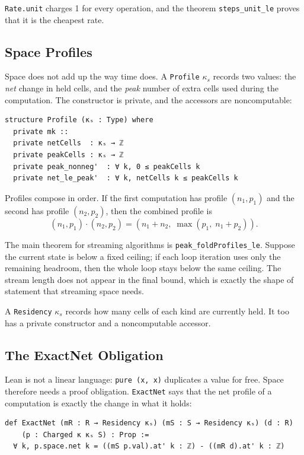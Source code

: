 \documentclass[acmsmall,nonacm]{acmart}
\begin{document}
\lstinline{Rate.unit} charges 1 for every operation, and the theorem \lstinline{steps_unit_le} proves that it is the cheapest rate.

\subsection{Space Profiles}\label{sec:profiles}

Space does not add up the way time does.
A \lstinline{Profile} $\kappa_s$ records two values: the \emph{net} change in held cells, and the \emph{peak} number of extra cells used during the computation.
The constructor is private, and the accessors are noncomputable:

\begin{lstlisting}
structure Profile (κₛ : Type) where
  private mk ::
  private netCells  : κₛ → ℤ
  private peakCells : κₛ → ℤ
  private peak_nonneg'  : ∀ k, 0 ≤ peakCells k
  private net_le_peak'  : ∀ k, netCells k ≤ peakCells k
\end{lstlisting}

Profiles compose in order.
If the first computation has profile $(n_1,p_1)$ and the second has profile $(n_2,p_2)$, then the combined profile is
\[
(n_1, p_1) \cdot (n_2, p_2) = (n_1 + n_2,\; \max(p_1,\; n_1 + p_2)).
\]

The main theorem for streaming algorithms is \lstinline{peak_foldProfiles_le}.
Suppose the current state is below a fixed ceiling; if each loop iteration uses only the remaining headroom, then the whole loop stays below the same ceiling.
The stream length does not appear in the final bound, which is exactly the shape of statement that streaming space needs.

A \lstinline{Residency} $\kappa_s$ records how many cells of each kind are currently held.
It too has a private constructor and a noncomputable accessor.

\subsection{The ExactNet Obligation}\label{sec:exactnet}

Lean is not a linear language: \lstinline{pure (x, x)} duplicates a value for free.
Space therefore needs a proof obligation.
\lstinline{ExactNet} says that the net profile of a computation is exactly the change in what it holds:

\begin{lstlisting}
def ExactNet (mR : R → Residency κₛ) (mS : S → Residency κₛ) (d : R)
    (p : Charged κ κₛ S) : Prop :=
  ∀ k, p.space.net k = ((mS p.val).at' k : ℤ) - ((mR d).at' k : ℤ)
\end{lstlisting}
\end{document}
